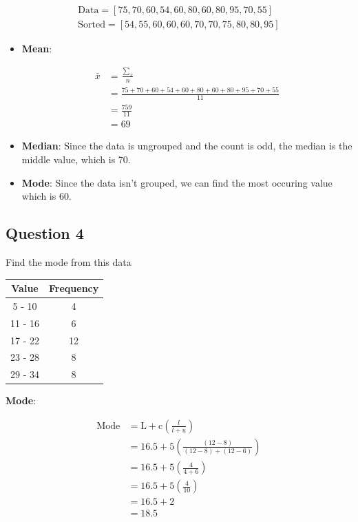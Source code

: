 \documentclass[12pt,titlepage]{article}
\begin{document}
\begin{align*}
    \text{Data} = [75, 70, 60, 54, 60, 80, 60, 80, 95, 70, 55]\\
    \text{Sorted} = [54, 55, 60, 60, 60, 70, 70, 75, 80, 80, 95]
\end{align*}

\begin{itemize}
    \item {
        \textbf{Mean}:

        \begin{align*}
            \bar{x} &= \frac{\sum_ x}{n} \\
            &= \frac{75 + 70 + 60 + 54 + 60 + 80 + 60 + 80 + 95 + 70 + 55}{11} \\
            &= \frac{759}{11} \\
            &= 69
        \end{align*}
    }
    \item {
        \textbf{Median}:
        Since the data is ungrouped and the count is odd, the median is the middle value, which is 70.
    }
    \item {
        \textbf{Mode}:
        Since the data isn't grouped, we can find the most occuring value which is 60.
    }
\end{itemize}

\pagebreak

\subsection{Question 4}
Find the mode from this data

\begin{center}
    \begin{tabular}{|c|c|}
        \hline
        Value & Frequency \\
        \hline
        5 - 10 & 4 \\
        \hline
        11 - 16 & 6 \\
        \hline
        17 - 22 & 12 \\
        \hline
        23 - 28 & 8 \\
        \hline
        29 - 34 & 8 \\
        \hline
    \end{tabular}
\end{center}

\textbf{Mode}:

\begin{align*}
    \text{Mode} &= \text{L} + \text{c} \left( \frac{l}{l+u} \right) \\
    &= 16.5 + 5 \left( \frac{(12-8)}{(12-8) + (12-6)} \right) \\
    &= 16.5 + 5 \left( \frac{4}{4 + 6} \right) \\
    &= 16.5 + 5 \left( \frac{4}{10} \right) \\
    &= 16.5 + 2 \\
    &= 18.5
\end{align*}
\end{document}
